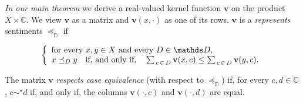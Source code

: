 \documentclass[ecta,nameyear,draft]{econsocart}
\newcommand{\R}{\mathbb R}
\newcommand{\mbbd}{{\mathds D}}
\newcommand{\mbbc}{{\mathds C}}
\theoremstyle{plain}
\theoremstyle{remark}
\begin{document}
\emph{In our main theorem}\label{sec-main} we derive a real-valued kernel
function $\mathbf{v}$ on the product $X \times \mbbc$. We view $\mathbf{v}$ as
a matrix and $\mathbf{v}(x, \cdot)$ as one of its rows.  $\mathbf{v}$ is a
\emph{represents} sentiments $\preceq_{\mbbd}$ if
 \begin{linenomath*} 
\begin{equation}\notag\label{eq-rep-main}
  \left\{
  \begin{array}{l}
    \text{for every $x , y \in X$ and every $D \in \mbbd$,}\\
    x \preceq_{D} y \quad \text{if, and only if,} \quad \sum _ {\, c \,\in\, D}
    \mathbf{v}(x, c) \leq \sum_{\, c \,\in\, D} \mathbf{v}(y, c) .
  \end{array}\right.
\end{equation}
\end{linenomath*}
The matrix $\mathbf{v}$ \emph{respects case equivalence} (with respect to
$\preceq_{\mbbd}$) if, for every $c,d\in \mbbc$, $c \sim^{\star} d$ if, and
only if, the columns $\mathbf{v}(\cdot, c)$ and $\mathbf{v}(\cdot, d)$ are equal.
\end{document}
